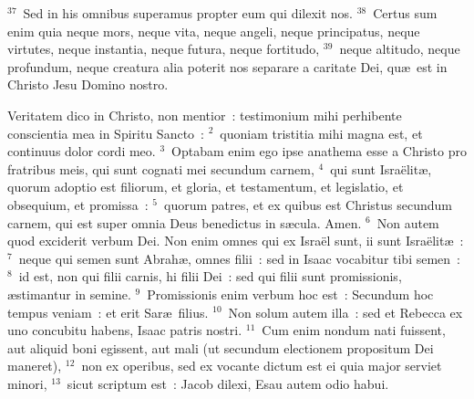 ${}^{37}$~Sed in his omnibus superamus propter eum qui dilexit nos.
${}^{38}$~Certus sum enim quia neque mors, neque vita, neque angeli, neque principatus, neque virtutes, neque instantia, neque futura, neque fortitudo,
${}^{39}$~neque altitudo, neque profundum, neque creatura alia poterit nos separare a caritate Dei, qu\ae\ est in Christo Jesu Domino nostro.

\lettrine[lines=3,image=true,loversize=0.05,lraise=-0.03]{V}{}eritatem dico in Christo, non mentior~: testimonium mihi perhibente conscientia mea in Spiritu Sancto~:
${}^{2}$~quoniam tristitia mihi magna est, et continuus dolor cordi meo.
${}^{3}$~Optabam enim ego ipse anathema esse a Christo pro fratribus meis, qui sunt cognati mei secundum carnem,
${}^{4}$~qui sunt Isra\"elit\ae , quorum adoptio est filiorum, et gloria, et testamentum, et legislatio, et obsequium, et promissa~:
${}^{5}$~quorum patres, et ex quibus est Christus secundum carnem, qui est super omnia Deus benedictus in s\ae cula. Amen.
${}^{6}$~Non autem quod exciderit verbum Dei. Non enim omnes qui ex Isra\"el sunt, ii sunt Isra\"elit\ae~:
${}^{7}$~neque qui semen sunt Abrah\ae , omnes filii~: sed in Isaac vocabitur tibi semen~:
${}^{8}$~id est, non qui filii carnis, hi filii Dei~: sed qui filii sunt promissionis, \ae stimantur in semine.
${}^{9}$~Promissionis enim verbum hoc est~: Secundum hoc tempus veniam~: et erit Sar\ae\ filius.
${}^{10}$~Non solum autem illa~: sed et Rebecca ex uno concubitu habens, Isaac patris nostri.
${}^{11}$~Cum enim nondum nati fuissent, aut aliquid boni egissent, aut mali (ut secundum electionem propositum Dei maneret),
${}^{12}$~non ex operibus, sed ex vocante dictum est ei quia major serviet minori,
${}^{13}$~sicut scriptum est~: Jacob dilexi, Esau autem odio habui.


